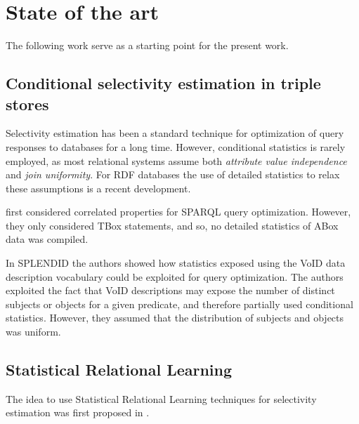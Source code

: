 
\section{State of the art}

The following work serve as a starting point for the present work.

\subsection{Conditional selectivity estimation in triple stores}

Selectivity estimation has been a standard technique for optimization
of query responses to databases for a long time. However, conditional
statistics is rarely employed, as most relational systems assume both
\emph{attribute value independence} and \emph{join uniformity}. For
RDF databases the use of detailed statistics to relax these
assumptions is a recent development.

\cite{Lv:2009:SEC:1685170.1685590} first considered correlated
properties for SPARQL query optimization. However, they only
considered TBox statements, and so, no detailed statistics of ABox
data was compiled.

In SPLENDID\cite{splendid} the authors showed how statistics exposed
using the VoID data description vocabulary\cite{void} could be
exploited for query optimization. The authors exploited the fact that
VoID descriptions may expose the number of distinct subjects or
objects for a given predicate, and therefore partially used
conditional statistics. However, they assumed that the distribution of
subjects and objects was uniform.

\subsection{Statistical Relational Learning}

The idea to use Statistical Relational Learning techniques for
selectivity estimation was first proposed in \cite{selectivityPRM}.